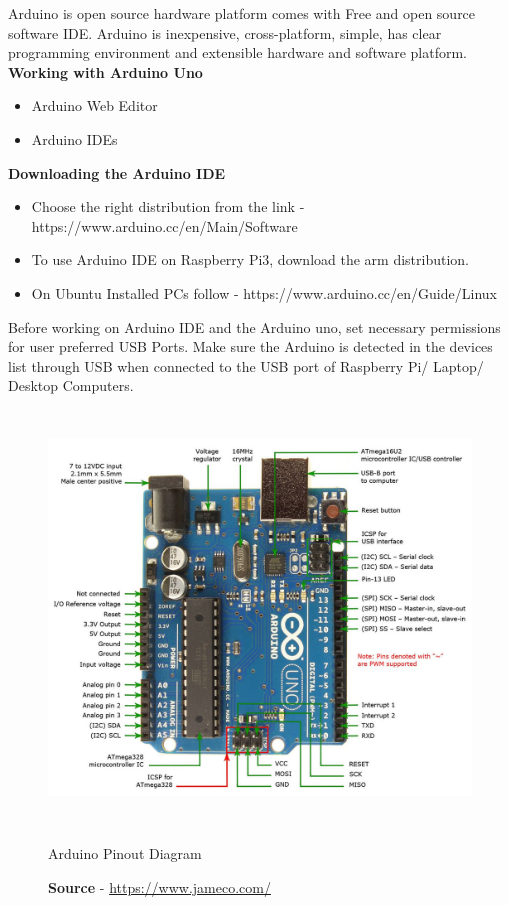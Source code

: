 \documentclass[12pt,a4paper]{article}
\begin{document}
Arduino is open source hardware platform comes with Free and open source software IDE. Arduino is inexpensive, cross-platform, simple, has clear programming environment and extensible hardware and software platform.
\vspace{5mm}
\\
\textbf{Working with Arduino Uno} 
\begin{itemize}[noitemsep,nolistsep]
    \item Arduino Web Editor 
    \item Arduino IDEs
\end{itemize}
\vspace{5mm}
\textbf{Downloading the Arduino IDE}
\begin{itemize}[noitemsep,nolistsep]
	\item Choose the right distribution from the link -  https://www.arduino.cc/en/Main/Software
	\item To use Arduino IDE on Raspberry Pi3, download the arm distribution.
	\item On Ubuntu Installed PCs follow - https://www.arduino.cc/en/Guide/Linux
\end{itemize}
\vspace{5mm}
Before working on Arduino IDE and the Arduino uno, set necessary permissions for user preferred USB Ports. Make sure the Arduino is detected in the devices list through USB when connected to the USB port of Raspberry Pi/ Laptop/ Desktop Computers.
\begin{figure}[h!]
    \centering
	\includegraphics[width=12cm, height=11cm]{Introduction/2.jpg}
	\caption{Arduino Pinout Diagram}
	\caption*{\textbf{Source} - \url{https://www.jameco.com/}}
\end{figure}
\end{document}
